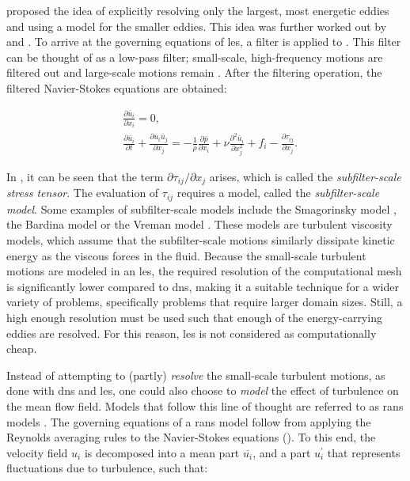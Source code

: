 \citet{smagorinskyGeneralCirculationExperiments1963} proposed the idea of explicitly resolving only the largest, most energetic eddies and using a model for the smaller eddies. This idea was further worked out by \citet{lilly1967representation} and \citet{deardorffThreedimensionalNumericalStudy1974}. To arrive at the governing equations of \acrshort{les}, a filter is applied to . This filter can be thought of as a low-pass filter; small-scale, high-frequency motions are filtered out and large-scale motions remain \citep{leonardEnergyCascadeLargeEddy1975}. After the filtering operation, the filtered Navier-Stokes equations are obtained:

\begin{align}
    &\frac{\partial \overline{u}_i}{\partial x_i} = 0, \label{eq:continuity_filtered}\\ 
    &\frac{\partial \overline{u}_i}{\partial t} + \frac{\partial \overline{u}_i \overline{u}_j}{\partial x_j} = - \frac{1}{\rho} \frac{\partial \overline{p}}{\partial x_i} + \nu \frac{\partial^2 \overline{u}_i}{\partial x_j^2} + f_i - \frac{\partial \tau_{ij}}{\partial x_j}.  \label{eq:momentum_filtered}
\end{align}

In , it can be seen that the term $\partial \tau_{ij} / \partial x_j$ arises, which is called the \emph{subfilter-scale stress tensor}. The evaluation of $\tau_{ij}$ requires a model, called the \emph{subfilter-scale model}. Some examples of subfilter-scale models include the Smagorinsky model \citep{smagorinskyGeneralCirculationExperiments1963}, the Bardina model \citep{bardinaImprovedSubgridscaleModels1980} or the Vreman model \citep{vremanEddyviscositySubgridscaleModel2004}. These models are turbulent viscosity models, which assume that the subfilter-scale motions similarly dissipate kinetic energy as the viscous forces in the fluid. Because the small-scale turbulent motions are modeled in an \acrshort{les}, the required resolution of the computational mesh is significantly lower compared to \acrshort{dns}, making it a suitable technique for a wider variety of problems, specifically problems that require larger domain sizes. Still, a high enough resolution must be used such that enough of the energy-carrying eddies are resolved. For this reason, \acrshort{les} is not considered as computationally cheap.

Instead of attempting to (partly) \emph{resolve} the small-scale turbulent motions, as done with \acrshort{dns} and \acrshort{les}, one could also choose to \emph{model} the effect of turbulence on the mean flow field. Models that follow this line of thought are referred to as \acrlong{rans} models \citep{popeTurbulentFlows2000}. The governing equations of a \acrshort{rans} model follow from applying the Reynolds averaging rules to the Navier-Stokes equations (). To this end, the velocity field $u_i$ is decomposed into a mean part $\overline{u_i}$, and a part $u_i^\prime$ that represents fluctuations due to turbulence, such that:

